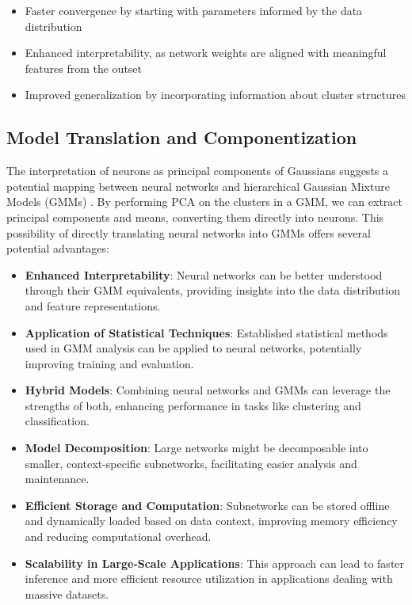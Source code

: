 \begin{itemize} \item Faster convergence by starting with parameters informed by the data distribution \item Enhanced interpretability, as network weights are aligned with meaningful features from the outset \item Improved generalization by incorporating information about cluster structures \end{itemize}

\subsection{Model Translation and Componentization}

The interpretation of neurons as principal components of Gaussians suggests a potential mapping between neural networks and hierarchical Gaussian Mixture Models (GMMs) \citep{jacobs1991adaptive}. By performing PCA on the clusters in a GMM, we can extract principal components and means, converting them directly into neurons. This possibility of directly translating neural networks into GMMs offers several potential advantages:

\begin{itemize}
    \item \textbf{Enhanced Interpretability}: Neural networks can be better understood through their GMM equivalents, providing insights into the data distribution and feature representations.
    \item \textbf{Application of Statistical Techniques}: Established statistical methods used in GMM analysis can be applied to neural networks, potentially improving training and evaluation.
    \item \textbf{Hybrid Models}: Combining neural networks and GMMs can leverage the strengths of both, enhancing performance in tasks like clustering and classification.
    \item \textbf{Model Decomposition}: Large networks might be decomposable into smaller, context-specific subnetworks, facilitating easier analysis and maintenance.
    \item \textbf{Efficient Storage and Computation}: Subnetworks can be stored offline and dynamically loaded based on data context, improving memory efficiency and reducing computational overhead.
    \item \textbf{Scalability in Large-Scale Applications}: This approach can lead to faster inference and more efficient resource utilization in applications dealing with massive datasets.
\end{itemize}

